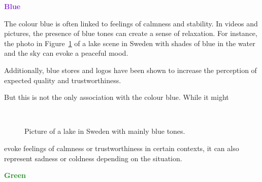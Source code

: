 \documentclass[../MasterThesis.tex]{subfiles}
\begin{document}
\newpage
\textbf{\textcolor{BlueViolet}{Blue}}

%
\begin{minipage}{0.45\textwidth}
	The colour blue is often linked to feelings of calmness and stability. In videos and pictures, the presence of blue tones can create a sense of relaxation. For instance, the photo in Figure~\ref{figure:blue} of a lake scene in Sweden with shades of blue in the water and the sky can evoke a peaceful mood.
	
	Additionally, blue stores and logos have been shown to increase the perception of expected quality and trustworthiness.~\cite{blue_trust, colour2}
	
	But this is not the only association with the colour blue. While it might
	
	
	
\end{minipage}\begin{minipage}{0.05\textwidth}
	\ 
\end{minipage}\begin{minipage}{0.5\textwidth}
	\begin{figure}[H]
		\begin{center}
			\caption[Picture of a lake in Sweden with mainly blue tones.]{Picture of a lake in Sweden with mainly blue tones.}
			\label{figure:blue}
		\end{center}
	\end{figure}\hfill
\end{minipage}
%

\vspace*{-0.2em}
evoke feelings of calmness or trustworthiness in certain contexts, it can also represent sadness or coldness depending on the situation.~\cite{colour2}


\textbf{\textcolor{ForestGreen}{Green}}
\end{document}
